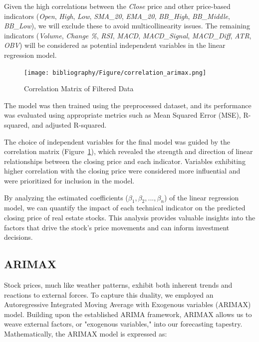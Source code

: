 \documentclass{ieeeojies}
\begin{document}
Given the high correlations between the \textit{Close} price and other price-based indicators (\textit{Open}, \textit{High}, \textit{Low}, \textit{SMA\_20}, \textit{EMA\_20}, \textit{BB\_High}, \textit{BB\_Middle}, \textit{BB\_Low}), we will exclude these to avoid multicollinearity issues. The remaining indicators (\textit{Volume}, \textit{Change \%}, \textit{RSI}, \textit{MACD}, \textit{MACD\_Signal}, \textit{MACD\_Diff}, \textit{ATR}, \textit{OBV}) will be considered as potential independent variables in the linear regression model. 

\begin{figure}[ht]
\centering
  \begin{minipage}{0.5\textwidth}
    \centering
    \texttt{[image: bibliography/Figure/correlation\_arimax.png]}
    \caption{Correlation Matrix of Filtered Data}
    \label{tab:correlation_matrix}
  \end{minipage}
\end{figure}


The model was then trained using the preprocessed dataset, and its performance was evaluated using appropriate metrics such as Mean Squared Error (MSE), R-squared, and adjusted R-squared.

The choice of independent variables for the final model was guided by the correlation matrix (Figure~\ref{tab:correlation_matrix}), which revealed the strength and direction of linear relationships between the closing price and each indicator. Variables exhibiting higher correlation with the closing price were considered more influential and were prioritized for inclusion in the model.

By analyzing the estimated coefficients (\( \beta_1, \beta_2, ..., \beta_n \)) of the linear regression model, we can quantify the impact of each technical indicator on the predicted closing price of real estate stocks. This analysis provides valuable insights into the factors that drive the stock's price movements and can inform investment decisions.
  \subsection{ARIMAX}
  Stock prices, much like weather patterns, exhibit both inherent trends and reactions to external forces. To capture this duality, we employed an Autoregressive Integrated Moving Average with Exogenous variables (ARIMAX) model. Building upon the established ARIMA framework, ARIMAX allows us to weave external factors, or "exogenous variables," into our forecasting tapestry.
  Mathematically, the ARIMAX model is expressed as:
  
\end{document}
